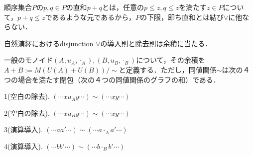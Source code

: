 \documentclass[uplatex, 12pt, dvipdfmx]{jsarticle}
\begin{document}
\begin{example}
    順序集合$P$の$p,q\in P$の直和$p+q$とは，任意の$p\le z,q\le z$を満たす$z\in P$について，$p+q\le z$であるような元であるから，$P$の下限，即ち直和とは結び$\lor$に他ならない．
\end{example}

\begin{example}[証明の圏にて]
    自然演繹におけるdisjunction $\lor$の導入則と除去則は余積に当たる．
\end{example}

\begin{example}[一般のモノイドの余積]
    \begin{definition*}[一般のモノイドの余積]
        一般のモノイド$(A,u_A,\cdot_A),(B,u_B,\cdot_B)$について，その余積を$A+B:=M(U(A)+U(B))/\sim$と定義する．ただし，同値関係$\sim$は次の４つの場合を満たす閉包（次の４つの同値関係のグラフの和）である．
        
        1(空白の除去). $(\cdots xu_Ay\cdots)\sim (\cdots xy\cdots)$

        2(空白の除去). $(\cdots xu_By\cdots)\sim (\cdots xy\cdots)$

        3(演算導入). $(\cdots aa'\cdots)\sim (\cdots a\cdot_Aa'\cdots)$

        4(演算導入). $(\cdots bb'\cdots)\sim (\cdots b\cdot_Bb'\cdots)$


\end{definition*}
\end{example}
\end{document}
